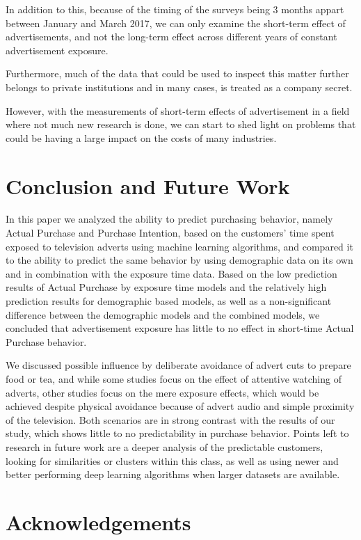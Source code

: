 \documentclass[review]{elsarticle}
\begin{document}
In addition to this, because of the timing of the surveys being 3 months appart between January and March 2017, we can only examine the short-term effect of advertisements, and not the long-term effect across different years of constant advertisement exposure.

Furthermore, much of the data that could be used to inspect this matter further belongs to private institutions and in many cases, is treated as a company secret. 

However, with the measurements of short-term effects of advertisement in a field where not much new research is done, we can start to shed light on problems that could be having a large impact on the costs of many industries.

\section{Conclusion and Future Work}
\label{conclusion}

In this paper we analyzed the ability to predict purchasing behavior, namely Actual Purchase and Purchase Intention, based on the customers' time spent exposed to television adverts using machine learning algorithms, and compared it to the ability to predict the same behavior by using demographic data on its own and in combination with the exposure time data. Based on the low prediction results of Actual Purchase by exposure time models and the relatively high prediction results for demographic based models, as well as a non-significant difference between the demographic models and the combined models, we concluded that advertisement exposure has little to no effect in short-time Actual Purchase behavior. 

We discussed possible influence by deliberate avoidance of advert cuts to prepare food or tea, and while some studies focus on the effect of attentive watching of adverts, other studies focus on the mere exposure effects, which would be achieved despite physical avoidance because of advert audio and simple proximity of the television. Both scenarios are in strong contrast with the results of our study, which shows little to no predictability in purchase behavior. Points left to research in future work are a deeper analysis of the predictable customers, looking for similarities or clusters within this class, as well as using newer and better performing deep learning algorithms when larger datasets are available. 

\section{Acknowledgements}
\end{document}

